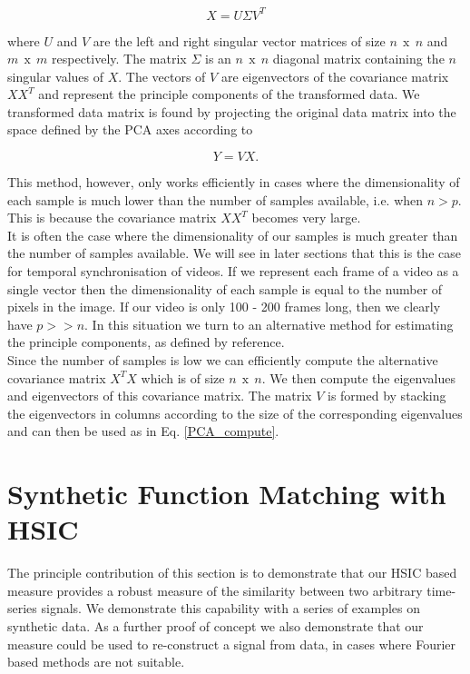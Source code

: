 \begin{equation}
X = U \Sigma V^{T} 
\end{equation}

\noindent where $U$ and $V$ are the left and right singular vector matrices of size $n\:\:\text{x}\:\:n$ and $m\:\:\text{x}\:\:m$ respectively. The matrix $\Sigma$ is an $n\:\:\text{x}\:\:n$ diagonal matrix containing the $n$ singular values of $X$. The vectors of $V$ are eigenvectors of the covariance matrix $X X^{T}$ and represent the principle components of the transformed data. We transformed data matrix is found by projecting the original data matrix into the space defined by the PCA axes according to

\begin{equation}
Y = V X. 
\label{PCA_compute}
\end{equation}

This method, however, only works efficiently in cases where the dimensionality of each sample is much lower than the number of samples available, i.e. when $n > p$. This is because the covariance matrix $X X^{T}$ becomes very large. \\

It is often the case where the dimensionality of our samples is much greater than the number of samples available. We will see in later sections that this is the case for temporal synchronisation of videos. If we represent each frame of a video as a single vector then the dimensionality of each sample is equal to the number of pixels in the image. If our video is only 100 - 200 frames long, then we clearly have $p >> n$. In this situation we turn to an alternative method for estimating the principle components, as defined by reference. \\

Since the number of samples is low we can efficiently compute the alternative covariance matrix $X^{T} X$ which is of size $n\:\:\text{x}\:\:n$. We then compute the eigenvalues and eigenvectors of this covariance matrix. The matrix $V$ is formed by stacking the eigenvectors in columns according to the size of the corresponding eigenvalues and can then be used as in Eq. \ref{PCA_compute}.\\

\section{Synthetic Function Matching with HSIC}

The principle contribution of this section is to demonstrate that our HSIC based measure provides a robust measure of the similarity between two arbitrary time-series signals. We demonstrate this capability with a series of examples on synthetic data. As a further proof of concept we also demonstrate that our measure could be used to re-construct a signal from data, in cases where Fourier based methods are not suitable. \\

